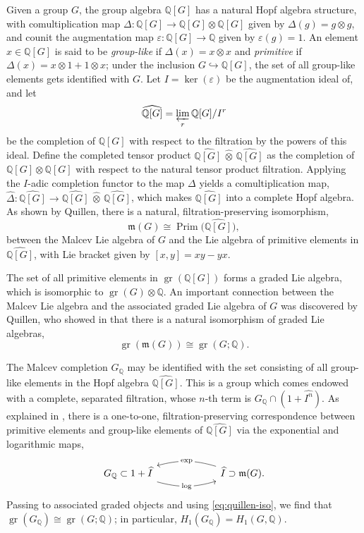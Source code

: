 \documentclass{article}
\numberwithin{equation}{section}
\theoremstyle{definition}
\newcommand{\Q}{\mathbb{Q}}
\newcommand{\m}{{\mathfrak{m}}}
\DeclareMathOperator{\gr}{gr}
\DeclareMathOperator{\Prim}{Prim}
\newcommand{\inj}{\hookrightarrow}
\begin{document}
Given a group $G$, the group algebra $\Q[G]$ has a natural Hopf 
algebra structure, with comultiplication map $\Delta\colon \Q[G]\to \Q[G]\otimes \Q[G]$  
given by $\Delta(g)=g\otimes g$, and counit the augmentation map 
$\varepsilon\colon \Q[G]\to \Q$ given by $\varepsilon(g)= 1$. 
An element $x\in \Q[G]$ is said to be {\em group-like}\/ if $\Delta(x)=x\otimes x$ 
and {\em primitive}\/ if $\Delta(x)=x\otimes 1+1\otimes x$; under 
the inclusion $G\inj \Q[G]$, the set of all group-like elements 
gets identified with $G$. Let $I=\ker(\varepsilon)$ be the augmentation 
ideal of, and let 
\begin{equation}
\label{eq:completion-groupalgebra}
\widehat{\Q[G]}=\varprojlim_r \Q[G]/I^r
\end{equation}
be the completion of $\Q[G]$ with respect to the filtration by 
the powers of this ideal.  
Define the completed tensor product $\widehat{\Q[G]}\, 
\hat{\otimes}\,  \widehat{\Q[G]}$ as the
completion of $\Q[G]\otimes \Q[G]$ with respect 
to the natural tensor product filtration. 
Applying the $I$-adic completion functor to the map 
$\Delta$ yields a comultiplication map,    
$\widehat{\Delta} \colon \widehat{\Q[G]}\to \widehat{\Q[G]}\, 
\hat{\otimes}\, \widehat{\Q[G]}$, which makes $\widehat{\Q[G]}$ 
into a complete Hopf algebra. As shown by Quillen,  
there is a natural, filtration-preserving isomorphism, 
\begin{equation}
\label{eq:mg-prim}
\m(G)\cong \Prim \big(\widehat{\Q[G]}\big),
\end{equation}
between the Malcev Lie algebra of $G$ and the Lie algebra of primitive 
elements in $\widehat{\Q[G]}$, with Lie bracket given by $[x,y]=xy-yx$.

The set of all primitive elements in $\gr(\Q[G])$ forms a graded 
Lie algebra, which is isomorphic to $\gr(G)\otimes \Q$.
An important connection between the Malcev Lie algebra 
and the associated graded Lie algebra of $G$ was discovered 
by Quillen, who showed in \cite{Qu68} that there is a natural isomorphism 
of graded Lie algebras, 
\begin{equation}
\label{eq:quillen-iso}
\gr(\m(G))\cong \gr(G;\Q).
\end{equation}

The Malcev completion $G_{\Q}$ may be identified 
with the set consisting of all group-like elements in the Hopf algebra 
$\widehat{\Q[G]}$.  This is a group which comes endowed with a complete, 
separated filtration, whose $n$-th term is $G_{\Q} \cap (1+\widehat{I^n})$.  
As explained in \cite{Massuyeau12}, there is a one-to-one, filtration-preserving 
correspondence between primitive elements 
and group-like elements of $\widehat{\Q[G]}$ via the exponential 
and logarithmic maps, 
\begin{equation}
\label{eq:explog}
\begin{tikzcd}[column sep=30]
 G_{\Q}\subset 1+\widehat{I} \ar[rr, bend right=16, "\log" description]&  
  & \widehat{I} \supset\m(G)\ar[ll, bend right=16, "\exp" description].
\end{tikzcd}
\end{equation} 
Passing to associated graded objects and using \eqref{eq:quillen-iso}, 
we find that $\gr( G_{\Q}) \cong \gr(G;\Q)$; in particular, $H_1(G_{\Q})=H_1(G,\Q)$.
\end{document}

